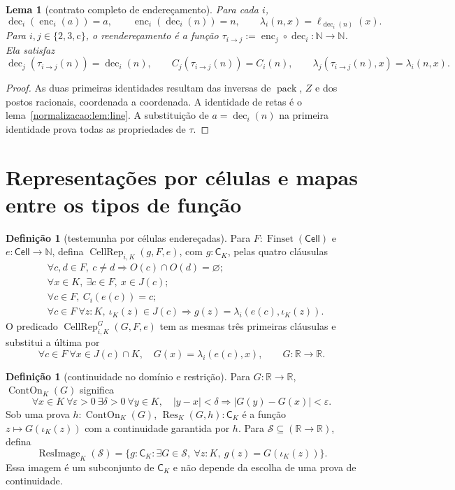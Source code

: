 \documentclass[12pt,a4paper]{article}
\theoremstyle{preciso}
\newtheorem{lema}[teorema]{Lema}
\theoremstyle{definition}
\newtheorem{definicao}[teorema]{Definição}
\newcommand{\N}{\mathbb N}
\newcommand{\R}{\mathbb R}
\newcommand{\Cell}{\mathsf{Cell}}
\newcommand{\CK}{\mathsf C_K}
\newcommand{\FS}{\operatorname{Finset}}
\newcommand{\Res}{\operatorname{Res}}
\newcommand{\ImageRes}{\operatorname{ResImage}}
\newcommand{\dec}{\operatorname{dec}}
\newcommand{\enc}{\operatorname{enc}}
\theoremstyle{preciso}
\theoremstyle{preciso}
\theoremstyle{preciso}
\theoremstyle{preciso}
\theoremstyle{definition}
\theoremstyle{preciso}
\theoremstyle{definition}
\theoremstyle{preciso}
\theoremstyle{preciso}
\theoremstyle{definition}
\begin{document}
\begin{lema}[contrato completo de endereçamento]\label{map:normalizacao:4.7}\label{normalizacao:lem:codec}
Para cada $i$,
\[
 \dec_i(\enc_i(a))=a,\qquad \enc_i(\dec_i(n))=n,
 \qquad\lambda_i(n,x)=\ell_{\dec_i(n)}(x).
\]
Para $i,j\in\{2,3,\mathrm c\}$, o reendereçamento é a função
$\tau_{i\to j}:=\enc_j\circ\dec_i:\N\to\N$. Ela satisfaz
\[
 \dec_j(\tau_{i\to j}(n))=\dec_i(n),\qquad
 C_j(\tau_{i\to j}(n))=C_i(n),\qquad
 \lambda_j(\tau_{i\to j}(n),x)=\lambda_i(n,x).
\]
\end{lema}
\begin{proof}
As duas primeiras identidades resultam das inversas de
$\operatorname{pack}$, $Z$ e dos postos racionais, coordenada a
coordenada. A identidade de retas é o lema~\ref{normalizacao:lem:line}.
A substituição de $a=\dec_i(n)$ na primeira identidade prova todas as
propriedades de $\tau$.
\end{proof}

\section{Representações por células e mapas entre os tipos de função}
\label{normalizacao:sec:bridge}

\begin{definicao}[testemunha por células endereçadas]\label{map:normalizacao:5.1}\label{normalizacao:def:cellrep}
Para $F:\FS(\Cell)$ e $e:\Cell\to\N$, defina
$\operatorname{CellRep}_{i,K}(g,F,e)$, com $g:\CK$, pelas quatro
cláusulas
\begin{align*}
 &\forall c,d\in F,\ c\ne d\Rightarrow O(c)\cap O(d)=\varnothing;\\
 &\forall x\in K,\ \exists c\in F,\ x\in J(c);\\
 &\forall c\in F,\ C_i(e(c))=c;\\
 &\forall c\in F\ \forall z:K,\ \iota_K(z)\in J(c)
       \Rightarrow g(z)=\lambda_i(e(c),\iota_K(z)).
\end{align*}
O predicado $\operatorname{CellRep}^G_{i,K}(G,F,e)$ tem as mesmas
três primeiras cláusulas e substitui a última por
\[
 \forall c\in F\ \forall x\in J(c)\cap K,\quad
 G(x)=\lambda_i(e(c),x),\qquad G:\R\to\R.
\]
\end{definicao}

\begin{definicao}[continuidade no domínio e restrição]\label{map:normalizacao:5.2}\label{normalizacao:def:restriction}
Para $G:\R\to\R$, $\operatorname{ContOn}_K(G)$ significa
\[
 \forall x\in K\ \forall\varepsilon>0\ \exists\delta>0\
 \forall y\in K,\quad |y-x|<\delta\Rightarrow
                         |G(y)-G(x)|<\varepsilon.
\]
Sob uma prova $h:\operatorname{ContOn}_K(G)$,
$\Res_K(G,h):\CK$ é a função $z\mapsto G(\iota_K(z))$ com a
continuidade garantida por $h$.
Para $\mathcal S\subseteq(\R\to\R)$, defina
\[
 \ImageRes_K(\mathcal S)=
 \{g:\CK:\exists G\in\mathcal S,\
             \forall z:K,\ g(z)=G(\iota_K(z))\}.
\]
Essa imagem é um subconjunto de $\CK$ e não depende da escolha
de uma prova de continuidade.
\end{definicao}
\end{document}
